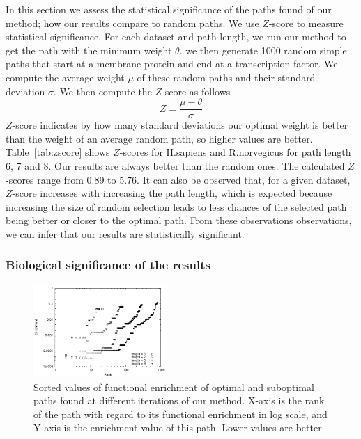 In this section we assess the statistical significance of the paths found of our
method; how our results compare to random paths. We use $Z$-score to
measure statistical significance. For each dataset and path length, we run our method to
get the path with the minimum weight $\theta$. we then generate 1000 random
simple paths that start at a membrane protein and end at a transcription
factor. We compute the average weight $\mu$ of these random paths and their
standard deviation $\sigma$. We then compute the $Z$-score as follows
\begin{equation}
Z = \frac{\mu - \theta}{\sigma}
\end{equation}
$Z$-score indicates by how many standard deviations our optimal weight is
better than the weight of an average random path, so higher values are better.
Table~\ref{tab:zscore} shows $Z$-scores for H.sapiens and R.norvegicus for path
length 6, 7 and 8. Our results are always better than the random ones.
The calculated $Z$-scores range from 0.89 to 5.76. It can also be observed that,
for a given dataset, $Z$-score increases with increasing the path length, which
is expected because increasing the size of random selection leads to less
chances of the selected path being better or closer to the optimal path.
From these observations observations, we can infer that our results are
statistically significant.


\subsubsection{Biological significance of the results}

\begin{figure}
  \centering
  \includegraphics[width=0.45\textwidth]{results/enrichment/enrich-rank}
  \caption{Sorted values of functional enrichment of optimal and suboptimal
  paths found at different iterations of our method. X-axis is the rank of the
  path with regard to its functional enrichment in log scale, and Y-axis is the
  enrichment value of this path. Lower values are better.}
  \label{fig:enrichment-rank}
\end{figure}


